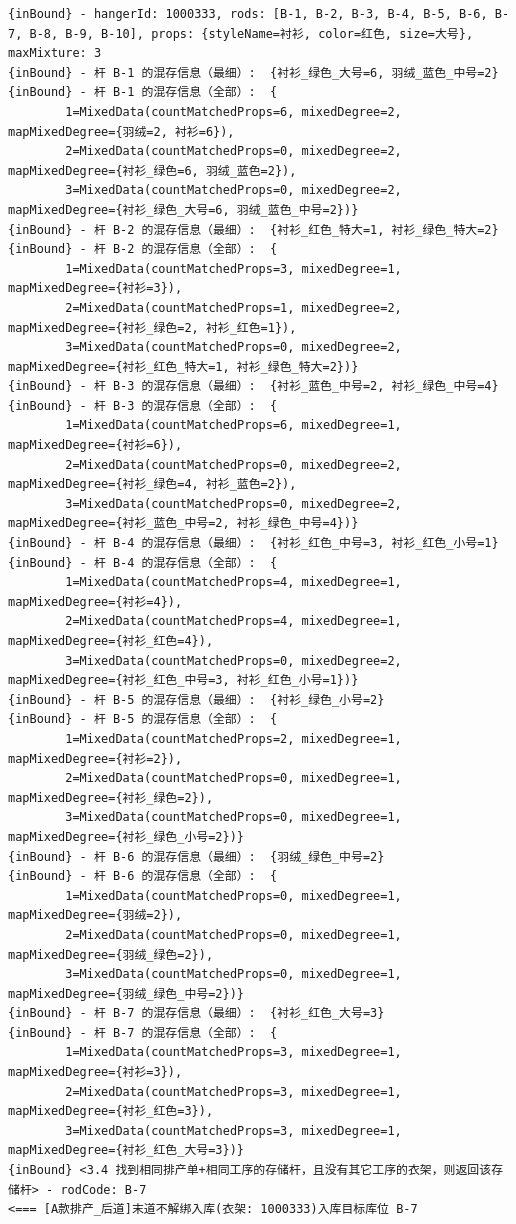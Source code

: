 {\begin{verbatim}
{inBound} - hangerId: 1000333, rods: [B-1, B-2, B-3, B-4, B-5, B-6, B-7, B-8, B-9, B-10], props: {styleName=衬衫, color=红色, size=大号}, maxMixture: 3
{inBound} - 杆 B-1 的混存信息（最细）:  {衬衫_绿色_大号=6, 羽绒_蓝色_中号=2}
{inBound} - 杆 B-1 的混存信息（全部）:  {
		1=MixedData(countMatchedProps=6, mixedDegree=2, mapMixedDegree={羽绒=2, 衬衫=6}), 
		2=MixedData(countMatchedProps=0, mixedDegree=2, mapMixedDegree={衬衫_绿色=6, 羽绒_蓝色=2}), 
		3=MixedData(countMatchedProps=0, mixedDegree=2, mapMixedDegree={衬衫_绿色_大号=6, 羽绒_蓝色_中号=2})}
{inBound} - 杆 B-2 的混存信息（最细）:  {衬衫_红色_特大=1, 衬衫_绿色_特大=2}
{inBound} - 杆 B-2 的混存信息（全部）:  {
		1=MixedData(countMatchedProps=3, mixedDegree=1, mapMixedDegree={衬衫=3}), 
		2=MixedData(countMatchedProps=1, mixedDegree=2, mapMixedDegree={衬衫_绿色=2, 衬衫_红色=1}), 
		3=MixedData(countMatchedProps=0, mixedDegree=2, mapMixedDegree={衬衫_红色_特大=1, 衬衫_绿色_特大=2})}
{inBound} - 杆 B-3 的混存信息（最细）:  {衬衫_蓝色_中号=2, 衬衫_绿色_中号=4}
{inBound} - 杆 B-3 的混存信息（全部）:  {
		1=MixedData(countMatchedProps=6, mixedDegree=1, mapMixedDegree={衬衫=6}), 
		2=MixedData(countMatchedProps=0, mixedDegree=2, mapMixedDegree={衬衫_绿色=4, 衬衫_蓝色=2}), 
		3=MixedData(countMatchedProps=0, mixedDegree=2, mapMixedDegree={衬衫_蓝色_中号=2, 衬衫_绿色_中号=4})}
{inBound} - 杆 B-4 的混存信息（最细）:  {衬衫_红色_中号=3, 衬衫_红色_小号=1}
{inBound} - 杆 B-4 的混存信息（全部）:  {
		1=MixedData(countMatchedProps=4, mixedDegree=1, mapMixedDegree={衬衫=4}), 
		2=MixedData(countMatchedProps=4, mixedDegree=1, mapMixedDegree={衬衫_红色=4}), 
		3=MixedData(countMatchedProps=0, mixedDegree=2, mapMixedDegree={衬衫_红色_中号=3, 衬衫_红色_小号=1})}
{inBound} - 杆 B-5 的混存信息（最细）:  {衬衫_绿色_小号=2}
{inBound} - 杆 B-5 的混存信息（全部）:  {
		1=MixedData(countMatchedProps=2, mixedDegree=1, mapMixedDegree={衬衫=2}), 
		2=MixedData(countMatchedProps=0, mixedDegree=1, mapMixedDegree={衬衫_绿色=2}), 
		3=MixedData(countMatchedProps=0, mixedDegree=1, mapMixedDegree={衬衫_绿色_小号=2})}
{inBound} - 杆 B-6 的混存信息（最细）:  {羽绒_绿色_中号=2}
{inBound} - 杆 B-6 的混存信息（全部）:  {
		1=MixedData(countMatchedProps=0, mixedDegree=1, mapMixedDegree={羽绒=2}), 
		2=MixedData(countMatchedProps=0, mixedDegree=1, mapMixedDegree={羽绒_绿色=2}), 
		3=MixedData(countMatchedProps=0, mixedDegree=1, mapMixedDegree={羽绒_绿色_中号=2})}
{inBound} - 杆 B-7 的混存信息（最细）:  {衬衫_红色_大号=3}
{inBound} - 杆 B-7 的混存信息（全部）:  {
		1=MixedData(countMatchedProps=3, mixedDegree=1, mapMixedDegree={衬衫=3}), 
		2=MixedData(countMatchedProps=3, mixedDegree=1, mapMixedDegree={衬衫_红色=3}), 
		3=MixedData(countMatchedProps=3, mixedDegree=1, mapMixedDegree={衬衫_红色_大号=3})}
{inBound} <3.4 找到相同排产单+相同工序的存储杆，且没有其它工序的衣架，则返回该存储杆> - rodCode: B-7
<=== [A款排产_后道]末道不解绑入库(衣架: 1000333)入库目标库位 B-7


\end{verbatim}}
